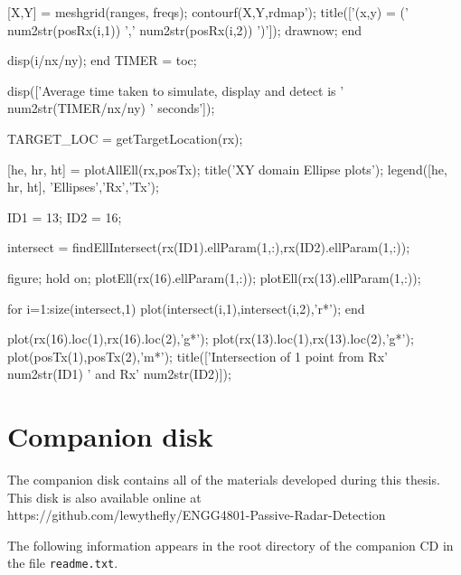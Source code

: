 \documentclass[12pt,openany,a4paper]{book}
\begin{document}
\begin{spverbatim}
        [X,Y] = meshgrid(ranges, freqs);
        contourf(X,Y,rdmap');
        title(['(x,y) = (' num2str(posRx(i,1)) ',' num2str(posRx(i,2)) ')']);
        drawnow;
    end
    
    disp(i/nx/ny);
end
TIMER = toc; %

disp(['Average time taken to simulate, display and detect is '
num2str(TIMER/nx/ny) ' seconds']);

TARGET_LOC = getTargetLocation(rx);

[he, hr, ht] = plotAllEll(rx,posTx);
title('XY domain Ellipse plots');
legend([he, hr, ht], 'Ellipses','Rx','Tx');

ID1 = 13;
ID2 = 16;

intersect = findEllIntersect(rx(ID1).ellParam(1,:),rx(ID2).ellParam(1,:));

figure; hold on;
plotEll(rx(16).ellParam(1,:));
plotEll(rx(13).ellParam(1,:));

for i=1:size(intersect,1)
    plot(intersect(i,1),intersect(i,2),'r*');    
end

plot(rx(16).loc(1),rx(16).loc(2),'g*');
plot(rx(13).loc(1),rx(13).loc(2),'g*');
plot(posTx(1),posTx(2),'m*');
title(['Intersection of 1 point from Rx' num2str(ID1) ' and Rx'
num2str(ID2)]);
\end{spverbatim}

\chapter{Companion disk}

The companion disk contains all of the materials developed during this thesis.
This disk is also available online at \\
https://github.com/lewythefly/ENGG4801-Passive-Radar-Detection

\bigskip

The following information appears in the root directory of the companion CD in the file \verb+readme.txt+.
\end{document}
